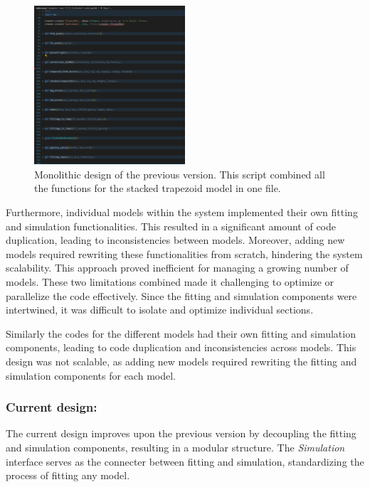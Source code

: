 \medskip

\begin{figure}[h]
    \centering
    \includegraphics[width=0.5\textwidth]{images/monolithic.png}
    \caption{Monolithic design of the previous version. This script combined all the functions for the stacked trapezoid model
     in one file.}
    \label{fig:monolithic_design}
\end{figure}

Furthermore, individual models within the system implemented their own fitting and simulation functionalities. This resulted in a 
significant amount of code duplication, leading to inconsistencies between models. Moreover, adding new models required rewriting 
these functionalities from scratch, hindering the system scalability. This approach proved inefficient for managing a growing number 
of models. These two limitations combined made it challenging to optimize or parallelize the code effectively. Since the fitting and 
simulation components were intertwined, it was difficult to isolate and optimize individual sections.

\medskip

Similarly the codes for the different models had their own fitting and simulation
components, leading to code duplication and inconsistencies across models. This design was not
scalable, as adding new models required rewriting the fitting and simulation components for each
model.

\subsubsection*{Current design:}

The current design improves upon the previous version by decoupling the fitting and 
simulation components, resulting in a modular structure. The \textit{Simulation} interface serves
 as the connecter between fitting and simulation, standardizing the process of fitting 
 any model.

